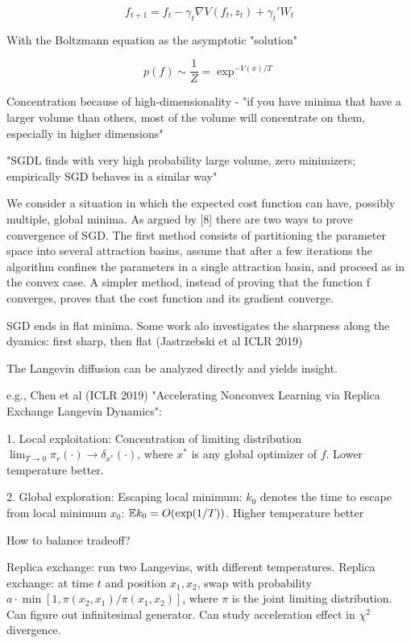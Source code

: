 \documentclass[english]{article}
\begin{document}
$$f_{t+1}
=
f_t
-\gamma_t 
\nabla V(f_t,z_t)
+\gamma_t' W_t
$$


With the Boltzmann equation as the asymptotic "solution"

$$
p(f) \sim \frac{1}{Z} = \exp^{-V(x)/T}
$$

\item Concentration because of high-dimensionality - "if you have minima that have a larger volume than others, most of the volume will concentrate on them, especially in higher dimensions"


"SGDL finds with very high probability large volume, zero minimizers; empirically SGD behaves in a similar way"

\item We consider a situation in which the expected cost function can have, possibly multiple, global minima. As argued
by [8] there are two ways to prove convergence of SGD. The
first method consists of partitioning the parameter space into
several attraction basins, assume that after a few iterations the
algorithm confines the parameters in a single attraction basin,
and proceed as in the convex case. A simpler method, instead
of proving that the function f converges, proves that the cost
function and its gradient converge.


\eenum

\item SGD ends in flat minima. Some work alo investigates the sharpness along the dyamics: first sharp, then flat (Jastrzebski et al ICLR 2019)

\item The Langevin diffusion can be analyzed directly and yields insight.

e.g., Chen et al (ICLR 2019) "Accelerating Nonconvex Learning via Replica Exchange Langevin Dynamics":

1. Local exploitation: Concentration of limiting distribution $\lim_{T\to0}\pi_r(\cdot)\to\delta_{x^*}(\cdot)$, where $x^*$ is any global optimizer of $f$. Lower temperature better.

2. Global exploration: Escaping local minimum: $k_0$ denotes the time to escape from local minimum $x_0$: $\mathbb{E} k_0 = O(\exp(1/T))$. Higher temperature better

How to balance tradeoff?

Replica exchange: run two Langevins, with different temperatures. Replica exchange: at time $t$ and position $x_1,x_2$, swap with probability $a\cdot \min [1, \pi(x_2,x_1)/\pi(x_1,x_2)]$, where $\pi$ is the joint limiting distribution. Can figure out infinitesimal generator. Can study acceleration effect in $\chi^2$ divergence.
\end{document}
